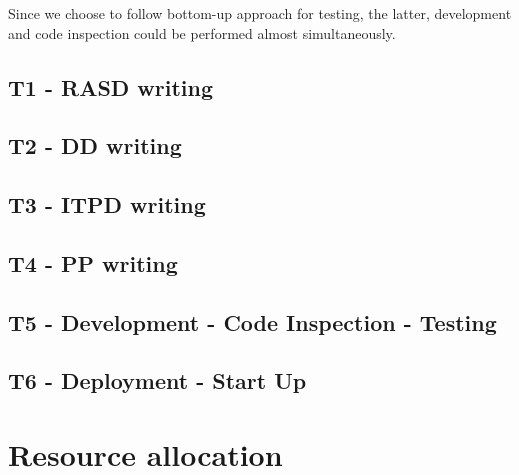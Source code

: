 \documentclass[english]{article}
\begin{document}
Since we choose to follow bottom-up approach for testing, the latter, development and code inspection could be performed almost simultaneously.

\subsection{T1 - RASD writing}


\subsection{T2 - DD writing}


\subsection{T3 - ITPD writing}


\subsection{T4 - PP writing}


\subsection{T5 - Development - Code Inspection -  Testing}


\subsection{T6 - Deployment - Start Up}



\section{Resource allocation}
\\
\end{document}
